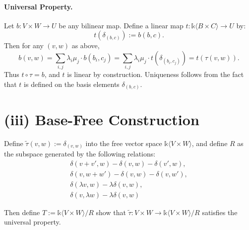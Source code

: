 \documentclass[10pt]{tufte-handout}
\begin{document}
\paragraph{Universal Property.} Let $b : V \times W \to U$ be any bilinear map. Define a linear map $t : \mathds{k}\langle B \times C \rangle \to U$ by:
\[ t(\delta_{(b,c)}) := b(b,c). \]
Then for any $(v,w)$ as above,
\[
 b(v,w) = \sum_{i,j} \lambda_i \mu_j \cdot b(b_i, c_j) = \sum_{i,j} \lambda_i \mu_j \cdot t(\delta_{(b_i, c_j)}) = t(\tau(v,w)).
\]
Thus $t \circ \tau = b$, and $t$ is linear by construction. Uniqueness follows from the fact that $t$ is defined on the basis elements $\delta_{(b,c)}$.



\section{(iii) Base-Free Construction}
Define $\widetilde{\tau}(v, w) := \delta_{(v,w)}$ into the free vector space $\mathds{k}\langle V \times W \rangle$, and define $R$ as the subspace generated by the following relations:
\begin{align*}
\delta(v + v', w) - \delta(v, w) - \delta(v', w), \\
\delta(v, w + w') - \delta(v, w) - \delta(v, w'), \\
\delta(\lambda v, w) - \lambda\delta(v, w), \\
\delta(v, \lambda w) - \lambda\delta(v, w)
\end{align*}

\noindent
Then define $T := \mathds{k}\langle V \times W \rangle / R$ show that $\widetilde{\tau}: V \times W \to \mathds{k} \langle V \times W \rangle / R$ satisfies the universal property.


\end{document}

